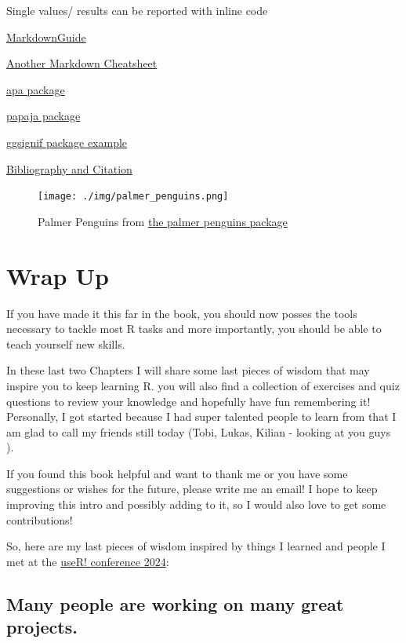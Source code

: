 \documentclass[
]{book}
\begin{document}
Single values/ results can be reported with inline code

\href{https://www.markdownguide.org/basic-syntax/}{MarkdownGuide}

\href{https://www.markdownguide.org/cheat-sheet/}{Another Markdown Cheatsheet}

\href{https://cran.r-project.org/web/packages/apa/vignettes/introduction.html}{apa package}

\href{https://frederikaust.com/papaja_man/}{papaja package}

\href{https://statisticsglobe.com/ggsignif-package-r}{ggsignif package example}

\href{https://bookdown.org/yihui/rmarkdown-cookbook/bibliography.html}{Bibliography and Citation}

\begin{figure}
\centering
\texttt{[image: ./img/palmer\_penguins.png]}
\caption{Palmer Penguins from \href{https://github.com/mcnakhaee/palmerpenguins}{the palmer penguins package}}
\end{figure}

\chapter*{Wrap Up}\label{wrap-up}

If you have made it this far in the book, you should now posses the tools necessary to tackle most R tasks and more importantly, you should be able to teach yourself new skills.

In these last two Chapters I will share some last pieces of wisdom that may inspire you to keep learning R.
you will also find a collection of exercises and quiz questions to review your knowledge and hopefully have fun remembering it!
Personally, I got started because I had super talented people to learn from that I am glad to call my friends still today (Tobi, Lukas, Kilian - looking at you guys ).

If you found this book helpful and want to thank me or you have some suggestions or wishes for the future, please write me an email!
I hope to keep improving this intro and possibly adding to it, so I would also love to get some contributions!

So, here are my last pieces of wisdom inspired by things I learned and people I met at the \href{https://events.linuxfoundation.org/user/}{useR! conference 2024}:

\section*{Many people are working on many great projects.}\label{many-people-are-working-on-many-great-projects.}
\end{document}
